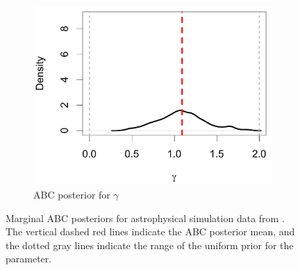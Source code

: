 \documentclass[ejs]{imsart}
\numberwithin{equation}{section}
\theoremstyle{plain}
\begin{document}
\begin{figure}[htbp]
\begin{subfigure}{0.32\textwidth}
\includegraphics[width = .95\textwidth]{figures/bate_marginal_gamma.pdf} 
\caption{ABC posterior for $\gamma$}\label{subfig:bate_gamma}
\end{subfigure}
\caption{Marginal ABC posteriors for astrophysical simulation data from \cite{Bate2012}.  The vertical dashed red lines indicate the ABC posterior mean, and the dotted gray lines indicate the range of the uniform prior for the parameter.  
 }
   \label{fig:abc_bate_posterior}
\end{figure}
\end{document}

